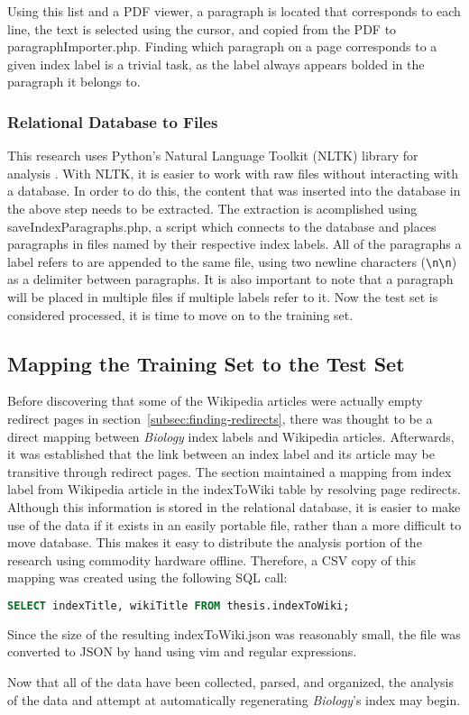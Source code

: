 Using this list and a PDF viewer, a paragraph is located that corresponds to each line, the text is selected using the cursor, and copied from the PDF to paragraphImporter.php.
Finding which paragraph on a page corresponds to a given index label is a trivial task, as the label always appears bolded in the paragraph it belongs to.

\subsubsection{Relational Database to Files}
\label{subsubsec:RDB2F}

This research uses Python's Natural Language Toolkit (NLTK) library for analysis \cite{nltk}.
With NLTK, it is easier to work with raw files without interacting with a database.
In order to do this, the content that was inserted into the database in the above step needs to be extracted.
The extraction is acomplished using saveIndexParagraphs.php, a script which connects to the database and places paragraphs in files named by their respective index labels.
All of the paragraphs a label refers to are appended to the same file, using two newline characters ({\tt{\textbackslash}n{\textbackslash}n}) as a delimiter between paragraphs.
It is also important to note that a paragraph will be placed in multiple files if multiple labels refer to it.
Now the test set is considered processed, it is time to move on to the training set.

\subsection{Mapping the Training Set to the Test Set}
\label{sec:indexToWiki}

Before discovering that some of the Wikipedia articles were actually empty redirect pages in section~\ref{subsec:finding-redirects}, there was thought to be a direct mapping between {\it Biology} index labels and Wikipedia articles.
Afterwards, it was established that the link between an index label and its article may be transitive through redirect pages.
The section maintained a mapping from index label from Wikipedia article in the indexToWiki table by resolving page redirects.
Although this information is stored in the relational database, it is easier to make use of the data if it exists in an easily portable file, rather than a more difficult to move database.
This makes it easy to distribute the analysis portion of the research using commodity hardware offline.
Therefore, a CSV copy of this mapping was created using the following SQL call:
\begin{lstlisting}[language=SQL]
SELECT indexTitle, wikiTitle FROM thesis.indexToWiki;
\end{lstlisting}
\noindent Since the size of the resulting indexToWiki.json was reasonably small, the file was converted to JSON by hand using vim and regular expressions.

Now that all of the data have been collected, parsed, and organized, the analysis of the data and attempt at automatically regenerating {\it Biology}'s index may begin.
